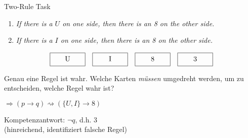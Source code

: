 \begin{frame}{Two-Rule Task {\scriptsize \cite[S.~61-63]{stenningHumanReasoningCognitive2008}}}

    \begin{enumerate}
        \item \emph{If there is a $U$ on one side, then there is an 8 on the other side.}
        \item \emph{If there is a $I$ on one side, then there is an 8 on the other side.}
    \end{enumerate}

    \[
        \framebox[5em][c]{U\strut}\quad
        \framebox[5em][c]{I\strut}\quad
        \framebox[5em][c]{8\strut}\quad
        \framebox[5em][c]{3\strut}
    \]

    Genau eine Regel ist wahr. Welche Karten \emph{müssen} umgedreht werden, um zu entscheiden, welche Regel wahr ist?

    $\Rightarrow (p \to q) \rightsquigarrow (\{U, I\} \to 8)$

    Kompetenzantwort: $\lnot q$, d.h. $3$\\
    (hinreichend, identifiziert falsche Regel)
\end{frame}

